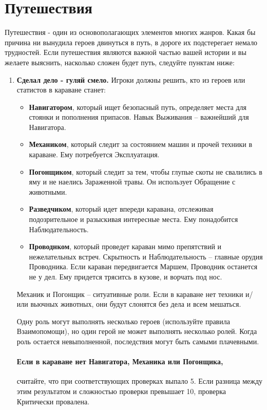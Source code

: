 \section{Путешествия}
Путешествия - один из основополагающих элементов многих жанров. Какая бы причина ни вынудила героев двинуться в путь, в дороге их подстерегает немало трудностей. Если путешествия являются важной частью вашей истории и вы желаете выяснить, насколько сложен будет путь, следуйте пунктам ниже:
\begin{enumerate}
  \item \textbf{Сделал дело - гуляй смело.} Игроки должны решить, кто из героев или статистов в караване станет:
    \begin{itemize}
      \item \textbf{Навигатором}, который ищет безопасный путь, определяет места для стоянки и пополнения припасов. Навык Выживания – важнейший для Навигатора.
      \item \textbf{Механиком}, который следит за состоянием машин и прочей техники в караване. Ему потребуется Эксплуатация.
      \item \textbf{Погонщиком}, который следит за тем, чтобы глупые скоты не свалились в яму и не наелись Зараженной травы. Он использует Обращение с животными.
      \item \textbf{Разведчиком}, который идет впереди каравана, отслеживая подозрительное и разыскивая интересные места. Ему понадобится Наблюдательность.
      \item \textbf{Проводнком}, который проведет караван мимо препятствий и нежелательных встреч. Скрытность и Наблюдательность – главные орудия Проводника. Если караван передвигается Маршем, Проводник останется не у дел. Ему придется тряситсь в кузове, и ворчать под нос.
    \end{itemize}

    \begin{tcolorbox}
      Механик и Погонщик – ситуативные роли. Если в караване нет техники и/ или вьючных животных, они будут слонятся без дела и всем мешаться.
    \end{tcolorbox}
    Одну роль могут выполнять несколько героев (используйте правила Взаимопомощи), но один герой не может выполнять несколько ролей. 
    \newline Когда роль остается невыполненной, последствия могут быть самыми плачевными.
    \paragraph{Если в караване нет Навигатора, Механика или Погонщика,} считайте, что при соответствующих проверках выпало 5. Если разница между этим результатом и сложностью проверки превышает 10, проверка Критически провалена.

\end{enumerate}
